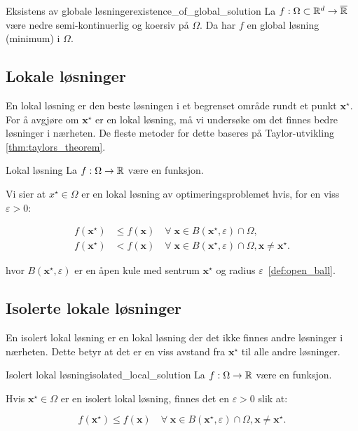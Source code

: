 \begin{theorem}{Eksistens av globale løsninger}{existence_of_global_solution}
	La \(f: \Omega \subset \mathbb{R}^d \to \overline{\mathbb{R}}\) være nedre semi-kontinuerlig og koersiv på \(\Omega\). Da har \(f\) en global løsning (minimum) i \(\Omega\).
\end{theorem}

\subsection{Lokale løsninger}
En lokal løsning er den beste løsningen i et begrenset område rundt et punkt \(\symbf{x}^\star\).
For å avgjøre om \(\symbf{x}^\star\) er en lokal løsning, må vi undersøke om det finnes bedre løsninger i nærheten.
De fleste metoder for dette baseres på Taylor-utvikling \ref{thm:taylors_theorem}.


\begin{definition}{Lokal løsning}{}
	La \(f: \Omega \to \mathbb{R}\) være en funksjon.

	Vi sier at \(x^\star \in \Omega\) er en lokal løsning av optimeringsproblemet hvis, for en viss \(\varepsilon > 0\):

	\begin{align*}
		f(\symbf{x}^\star) & \leq f(\symbf{x}) \quad \forall \; \symbf{x} \in B(\symbf{x}^\star, \varepsilon) \cap \Omega,                                                  \\
		f(\symbf{x}^\star) & < f(\symbf{x}) \quad \forall \; \symbf{x} \in B(\symbf{x}^\star, \varepsilon) \cap \Omega, \symbf{x} \neq \symbf{x}^\star. \tag{Strengt lokal}
	\end{align*}

	hvor \(B(\symbf{x}^\star, \varepsilon)\) er en åpen kule med sentrum \(\symbf{x}^\star\) og radius \(\varepsilon\)~\ref{def:open_ball}.
\end{definition}

\subsection{Isolerte lokale løsninger}
En isolert lokal løsning er en lokal løsning der det ikke finnes andre løsninger i nærheten. Dette betyr at det er en viss avstand fra \(\symbf{x}^\star\) til alle andre løsninger.

\begin{lemma}{Isolert lokal løsning}{isolated_local_solution}
	La \(f: \Omega \to \mathbb{R}\) være en funksjon.

	Hvis \(\symbf{x}^\star \in \Omega\) er en isolert lokal løsning, finnes det en \(\varepsilon > 0\) slik at:

	\[
		f(\symbf{x}^\star) \leq f(\symbf{x}) \quad \forall \; \symbf{x} \in B(\symbf{x}^\star, \varepsilon) \cap \Omega, \symbf{x} \neq \symbf{x}^\star.
	\]
\end{lemma}

